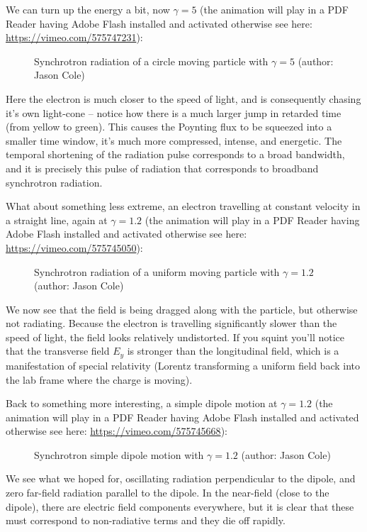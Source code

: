 	We can turn up the energy a bit, now $\gamma = 5$ (the animation will play in a PDF Reader having Adobe Flash installed and activated otherwise see here: \url{https://vimeo.com/575747231}):
	\begin{figure}[H]
		\caption[]{Synchrotron radiation of a circle moving particle with $\gamma=5$ (author: Jason Cole)}
	\end{figure}
	Here the electron is much closer to the speed of light, and is consequently chasing it's own light-cone – notice how there is a much larger jump in retarded time (from yellow to green). This causes the Poynting flux to be squeezed into a smaller time window, it's much more compressed, intense, and energetic. The temporal shortening of the radiation pulse corresponds to a broad bandwidth, and it is precisely this pulse of radiation that corresponds to broadband synchrotron radiation.
	
	What about something less extreme, an electron travelling at constant velocity in a straight line, again at $\gamma = 1.2$ (the animation will play in a PDF Reader having Adobe Flash installed and activated otherwise see here: \url{https://vimeo.com/575745050}):
	\begin{figure}[H]
		\caption[]{Synchrotron radiation of a uniform moving particle with $\gamma=1.2$ (author: Jason Cole)}
	\end{figure}
	We now see that the field is being dragged along with the particle, but otherwise not radiating. Because the electron is travelling significantly slower than the speed of light, the field looks relatively undistorted. If you squint you'll notice that the transverse field $E_y$ is stronger than the longitudinal field, which is a manifestation of special relativity (Lorentz transforming a uniform field back into the lab frame where the charge is moving).

	Back to something more interesting, a simple dipole motion at $\gamma = 1.2$ (the animation will play in a PDF Reader having Adobe Flash installed and activated otherwise see here: \url{https://vimeo.com/575745668}):
	\begin{figure}[H]
		\caption[]{Synchrotron simple dipole motion with $\gamma=1.2$ (author: Jason Cole)}
	\end{figure}
	We see what we hoped for, oscillating radiation perpendicular to the dipole, and zero far-field radiation parallel to the dipole. In the near-field (close to the dipole), there are electric field components everywhere, but it is clear that these must correspond to non-radiative terms and they die off rapidly.

